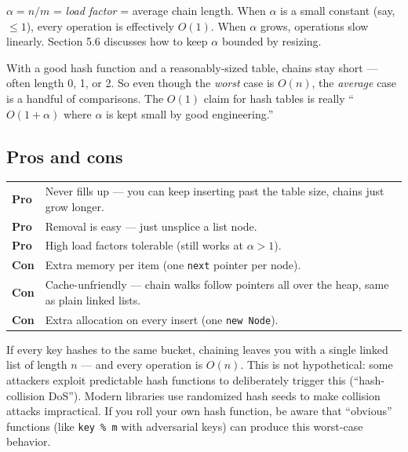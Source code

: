 \documentclass[11pt]{article}
\begin{document}
\noindent $\alpha = n/m$ = \emph{load factor} = average chain
length. When $\alpha$ is a small constant (say, $\leq 1$), every
operation is effectively $O(1)$. When $\alpha$ grows, operations
slow linearly. Section 5.6 discusses how to keep $\alpha$ bounded
by resizing.

\begin{ideabox}
With a good hash function and a reasonably-sized table, chains
stay short --- often length 0, 1, or 2. So even though the
\emph{worst} case is $O(n)$, the \emph{average} case is a
handful of comparisons. The $O(1)$ claim for hash tables is
really ``$O(1 + \alpha)$ where $\alpha$ is kept small by good
engineering.''
\end{ideabox}

\subsection*{Pros and cons}

\begin{center}
\begin{tabular}{|l|p{9cm}|}
\hline
\textbf{Pro} & Never fills up --- you can keep inserting past the
table size, chains just grow longer. \\
\textbf{Pro} & Removal is easy --- just unsplice a list node. \\
\textbf{Pro} & High load factors tolerable (still works at $\alpha > 1$). \\
\textbf{Con} & Extra memory per item (one \texttt{next} pointer per node). \\
\textbf{Con} & Cache-unfriendly --- chain walks follow pointers all
over the heap, same as plain linked lists. \\
\textbf{Con} & Extra allocation on every insert (one \texttt{new Node}). \\
\hline
\end{tabular}
\end{center}

\begin{warnbox}
If every key hashes to the same bucket, chaining leaves you with
a single linked list of length $n$ --- and every operation is
$O(n)$. This is not hypothetical: some attackers exploit
predictable hash functions to deliberately trigger this
(``hash-collision DoS''). Modern libraries use randomized hash
seeds to make collision attacks impractical. If you roll your
own hash function, be aware that ``obvious'' functions (like
\texttt{key \% m} with adversarial keys) can produce this
worst-case behavior.
\end{warnbox}
\end{document}
